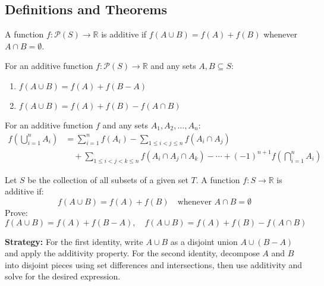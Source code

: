 \subsection*{Definitions and Theorems}

\begin{definition}
A function $f: \mathcal{P}(S) \to \mathbb{R}$ is additive if $f(A \cup B) = f(A) + f(B)$ whenever $A \cap B = \emptyset$.
\end{definition}

\begin{theorem}
For an additive function $f: \mathcal{P}(S) \to \mathbb{R}$ and any sets $A, B \subseteq S$:
\begin{enumerate}
\item $f(A \cup B) = f(A) + f(B - A)$
\item $f(A \cup B) = f(A) + f(B) - f(A \cap B)$
\end{enumerate}
\end{theorem}

\begin{theorem}
For an additive function $f$ and any sets $A_1, A_2, \ldots, A_n$:
\begin{align*}
f\left(\bigcup_{i=1}^n A_i\right) &= \sum_{i=1}^n f(A_i) - \sum_{1 \leq i < j \leq n} f(A_i \cap A_j) \\
&\quad + \sum_{1 \leq i < j < k \leq n} f(A_i \cap A_j \cap A_k) - \cdots + (-1)^{n+1} f\left(\bigcap_{i=1}^n A_i\right)
\end{align*}
\end{theorem}



\begin{problembox}
\begin{problemstatement}
Let \( S \) be the collection of all subsets of a given set \( T \).  
A function \( f: S \to \mathbb{R} \) is additive if:
\[
f(A \cup B) = f(A) + f(B)
\quad \text{whenever } A \cap B = \emptyset
\]  
Prove:  
\[
f(A \cup B) = f(A) + f(B - A), \quad 
f(A \cup B) = f(A) + f(B) - f(A \cap B)
\]
\end{problemstatement}
\end{problembox}

\noindent\textbf{Strategy:} For the first identity, write $A \cup B$ as a disjoint union $A \cup (B-A)$ and apply the additivity property. For the second identity, decompose $A$ and $B$ into disjoint pieces using set differences and intersections, then use additivity and solve for the desired expression.

